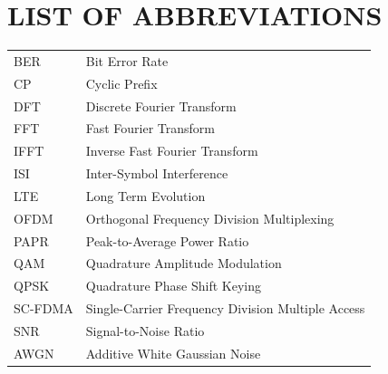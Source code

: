 
\section*{LIST OF ABBREVIATIONS}
{}

\begin{tabularx}{\textwidth}{L{0.45} L{1.55}}

BER       & Bit Error Rate \\

CP        & Cyclic Prefix \\

DFT       & Discrete Fourier Transform \\

FFT       & Fast Fourier Transform \\

IFFT      & Inverse Fast Fourier Transform \\

ISI       & Inter-Symbol Interference \\

LTE       & Long Term Evolution \\

OFDM      & Orthogonal Frequency Division Multiplexing \\

PAPR      & Peak-to-Average Power Ratio \\

QAM       & Quadrature Amplitude Modulation \\

QPSK      & Quadrature Phase Shift Keying \\

SC-FDMA   & Single-Carrier Frequency Division Multiple Access \\

SNR       & Signal-to-Noise Ratio \\

AWGN      & Additive White Gaussian Noise \\

\end{tabularx}

\newpage